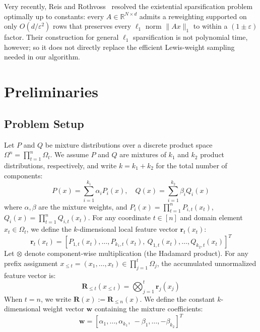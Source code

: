 \documentclass{article}
\begin{document}
Very recently, Reis and Rothvoss~\cite{RR26} resolved the
existential sparsification problem optimally up to constants: every
$A\in\mathbb{R}^{N\times d}$ admits a reweighting supported on only
$O(d/\varepsilon^2)$ rows that preserves every $\ell_1$ norm
$\|Ax\|_1$ to within a $(1\pm\varepsilon)$ factor. Their construction for general
$\ell_1$ sparsification is not polynomial time, however; so it does not
directly replace the efficient Lewis-weight sampling needed in our
algorithm.
\section{Preliminaries}

\subsection{Problem Setup}
Let $P$ and $Q$ be mixture distributions over a discrete product space $\Omega^n = \prod_{t=1}^n \Omega_t$. We assume $P$ and $Q$ are mixtures of $k_1$ and $k_2$ product distributions, respectively, and write $k=k_1+k_2$ for the total number of components:
\begin{equation}
    P(x) = \sum_{i=1}^{k_1} \alpha_i P_i(x), \quad Q(x) = \sum_{i=1}^{k_2} \beta_i Q_i(x)
\end{equation}
where $\alpha, \beta$ are the mixture weights, and $P_i(x) = \prod_{t=1}^n P_{i,t}(x_t)$, $Q_i(x) = \prod_{t=1}^n Q_{i,t}(x_t)$. For any coordinate $t \in [n]$ and domain element $x_t \in \Omega_t$, we define the $k$-dimensional local feature vector $\mathbf{r}_t(x_t)$:
\begin{equation}
    \mathbf{r}_t(x_t) = \left[ P_{1,t}(x_t), \dots, P_{k_1,t}(x_t), \ Q_{1,t}(x_t), \dots, Q_{k_2,t}(x_t) \right]^T
\end{equation}
Let $\otimes$ denote component-wise multiplication (the Hadamard product). For any prefix assignment $x_{\le t} = (x_1, \dots, x_t) \in \prod_{j=1}^t \Omega_j$, the accumulated unnormalized feature vector is:
\begin{equation}
    \mathbf{R}_{\le t}(x_{\le t}) = \bigotimes_{j=1}^t \mathbf{r}_j(x_j)
\end{equation}
When $t=n$, we write $\mathbf{R}(x) := \mathbf{R}_{\le n}(x)$. We define the constant $k$-dimensional weight vector $\mathbf{w}$ containing the mixture coefficients:
\begin{equation}
    \mathbf{w} = \left[ \alpha_1, \dots, \alpha_{k_1}, \ -\beta_1, \dots, -\beta_{k_2} \right]^T
\end{equation}
\end{document}
